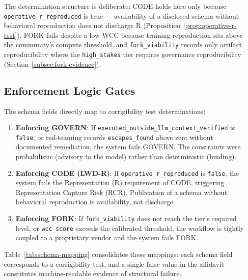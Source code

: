 \documentclass{article}
\theoremstyle{definition}
\begin{document}
The determination structure is deliberate: CODE holds here only because \texttt{operative\_r\_reproduced} is true --- availability of a disclosed schema without behavioral reproduction does not discharge R (Proposition~\ref{prop:operative-r-test}). FORK fails despite a low WCC because training reproduction sits above the community's compute threshold, and \texttt{fork\_viability} records only artifact reproducibility where the \texttt{high\_stakes} tier requires governance reproducibility (Section~\ref{subsec:fork-evidence}).

\subsection{Enforcement Logic Gates}

The schema fields directly map to corrigibility test determinations:

\begin{enumerate}
    \item \textbf{Enforcing GOVERN}: If \texttt{executed\_outside\_llm\_context\_verified} is \texttt{false}, or red-teaming records \texttt{escapes\_found} above zero without documented remediation, the system fails GOVERN. The constraints were probabilistic (advisory to the model) rather than deterministic (binding).

    \item \textbf{Enforcing CODE (LWD-R)}: If \texttt{operative\_r\_reproduced} is \texttt{false}, the system fails the Representation (R) requirement of CODE, triggering Representation Capture Risk (RCR). Publication of a schema without behavioral reproduction is availability, not discharge.

    \item \textbf{Enforcing FORK}: If \texttt{fork\_viability} does not reach the tier's required level, or \texttt{wcc\_score} exceeds the calibrated threshold, the workflow is tightly coupled to a proprietary vendor and the system fails FORK.
\end{enumerate}

Table~\ref{tab:schema-mapping} consolidates these mappings: each schema field corresponds to a corrigibility test, and a single false value in the affidavit constitutes machine-readable evidence of structural failure.
\end{document}
